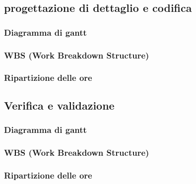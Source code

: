         \subsection{progettazione di dettaglio e codifica}
            \subsubsection{Diagramma di gantt}
            \subsubsection{WBS (Work Breakdown Structure)}
            \subsubsection{Ripartizione delle ore}

        \subsection{Verifica e validazione}
            \subsubsection{Diagramma di gantt}
            \subsubsection{WBS (Work Breakdown Structure)}
            \subsubsection{Ripartizione delle ore}

